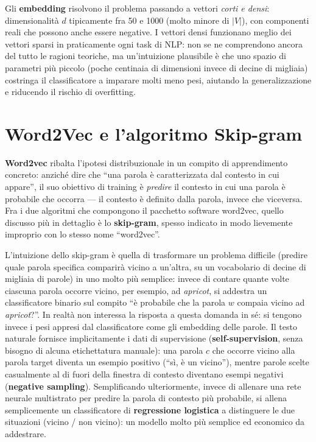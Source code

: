 \documentclass[11pt,a4paper]{report}
\begin{document}
Gli \textbf{embedding} risolvono il problema passando a vettori \emph{corti e densi}: dimensionalità $d$ tipicamente fra 50 e 1000 (molto minore di $|V|$), con componenti reali che possono anche essere negative. I vettori densi funzionano meglio dei vettori sparsi in praticamente ogni task di NLP: non se ne comprendono ancora del tutto le ragioni teoriche, ma un'intuizione plausibile è che uno spazio di parametri più piccolo (poche centinaia di dimensioni invece di decine di migliaia) costringa il classificatore a imparare molti meno pesi, aiutando la generalizzazione e riducendo il rischio di overfitting.

\section{Word2Vec e l'algoritmo Skip-gram}

\textbf{Word2vec} ribalta l'ipotesi distribuzionale in un compito di apprendimento concreto: anziché dire che ``una parola è caratterizzata dal contesto in cui appare'', il suo obiettivo di training è \emph{predire} il contesto in cui una parola è probabile che occorra --- il contesto è definito dalla parola, invece che viceversa. Fra i due algoritmi che compongono il pacchetto software word2vec, quello discusso più in dettaglio è lo \textbf{skip-gram}, spesso indicato in modo lievemente improprio con lo stesso nome ``word2vec''.

L'intuizione dello skip-gram è quella di trasformare un problema difficile (predire quale parola specifica comparirà vicino a un'altra, su un vocabolario di decine di migliaia di parole) in uno molto più semplice: invece di contare quante volte ciascuna parola occorre vicino, per esempio, ad \emph{apricot}, si addestra un classificatore binario sul compito ``è probabile che la parola $w$ compaia vicino ad \emph{apricot}?''. In realtà non interessa la risposta a questa domanda in sé: si tengono invece i pesi appresi dal classificatore come gli embedding delle parole. Il testo naturale fornisce implicitamente i dati di supervisione (\textbf{self-supervision}, senza bisogno di alcuna etichettatura manuale): una parola $c$ che occorre vicino alla parola target diventa un esempio positivo (``sì, è un vicino''), mentre parole scelte casualmente al di fuori della finestra di contesto diventano esempi negativi (\textbf{negative sampling}). Semplificando ulteriormente, invece di allenare una rete neurale multistrato per predire la parola di contesto più probabile, si allena semplicemente un classificatore di \textbf{regressione logistica} a distinguere le due situazioni (vicino / non vicino): un modello molto più semplice ed economico da addestrare.
\end{document}
